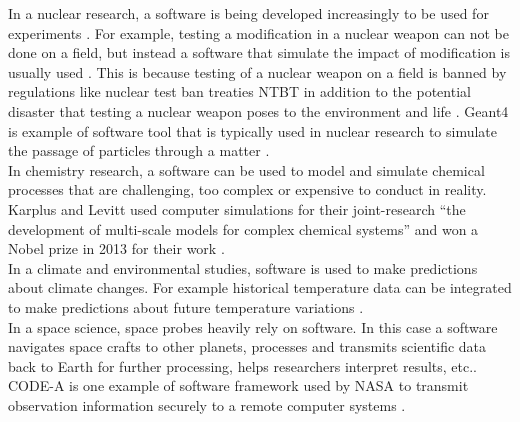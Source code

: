 In a nuclear research, a software is being developed increasingly to be used for experiments \citep{yan2017case}. For example, testing a modification in a nuclear weapon can not be done on a field, but instead a software that simulate the impact of modification is usually used \citep{kanewala2014testing}. This is because testing of a nuclear weapon on a field is banned by regulations like nuclear test ban treaties \ac{NTBT} in addition to the potential disaster that testing a nuclear weapon poses to the environment and life \citep{enwiki:1053274189}. \ac{Geant4} is example of software tool that is typically used in nuclear research to simulate the passage of particles through a matter \citep{agostinelli2003geant4}.  \\


In chemistry research, a software can be used to model and simulate chemical processes that are challenging, too complex or expensive to conduct in reality. Karplus and Levitt used computer simulations for their joint-research “the development of multi-scale models for complex chemical systems”  and won a Nobel prize in 2013 for their work \citep{storer2017bridging, andre2014nobel}.\\

In a climate and environmental studies, software is used to make predictions about climate changes. For example historical temperature data can be integrated to make predictions about future temperature variations \citep{storer2017bridging}.  \\


In a space science, space probes heavily rely on software. In this case a software navigates space crafts to other planets, processes and transmits scientific data back to Earth for further processing, helps researchers interpret results, etc.\citep{lutz2011software}. CODE-A is one example of software framework used by \ac{NASA} to transmit observation information securely to a remote computer systems \citep{NASA2022}. \\

